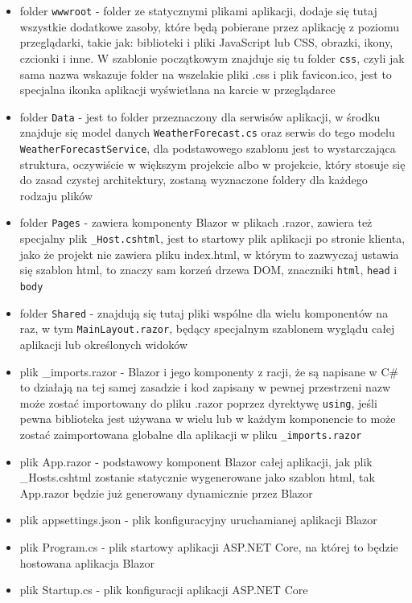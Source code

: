 \documentclass[12pt,a4paper,oneside]{book}
\begin{document}
\begin{itemize}
  \item folder \texttt{wwwroot} - folder ze statycznymi plikami aplikacji, dodaje się tutaj wszystkie dodatkowe zasoby, które będą pobierane przez aplikację z poziomu przeglądarki, takie jak: biblioteki i pliki JavaScript lub CSS, obrazki, ikony, czcionki i inne. W szablonie początkowym znajduje się tu folder \texttt{css}, czyli jak sama nazwa wskazuje folder na wszelakie pliki .css i plik favicon.ico, jest to specjalna ikonka aplikacji wyświetlana na karcie w przeglądarce
  \item folder \texttt{Data} - jest to folder przeznaczony dla serwisów aplikacji, w środku znajduje się model danych \texttt{WeatherForecast.cs} oraz serwis do tego modelu \texttt{WeatherForecastService}, dla podstawowego szablonu jest to wystarczająca struktura, oczywiście w większym projekcie albo w projekcie, który stosuje się do zasad czystej architektury, zostaną wyznaczone foldery dla każdego rodzaju plików
  \item folder \texttt{Pages} - zawiera komponenty Blazor w plikach .razor, zawiera też specjalny plik \texttt{\_Host.cshtml}, jest to startowy plik aplikacji po stronie klienta, jako że projekt nie zawiera pliku index.html, w którym to zazwyczaj ustawia się szablon html, to znaczy sam korzeń drzewa DOM, znaczniki \texttt{html}, \texttt{head} i \texttt{body}
  \item folder \texttt{Shared} - znajdują się tutaj pliki wspólne dla wielu komponentów na raz, w tym \texttt{MainLayout.razor}, będący specjalnym szablonem wyglądu całej aplikacji lub określonych widoków
  \item plik \_imports.razor - Blazor i jego komponenty z racji, że są napisane w C\# to działają na tej samej zasadzie i kod zapisany w pewnej przestrzeni nazw może zostać importowany do pliku .razor poprzez dyrektywę \texttt{using}, jeśli pewna biblioteka jest używana w wielu lub w każdym komponencie to może zostać zaimportowana globalne dla aplikacji w pliku \texttt{\_imports.razor}
  \item plik App.razor - podstawowy komponent Blazor całej aplikacji, jak plik \_Hosts.cshtml zostanie statycznie wygenerowane jako szablon html, tak App.razor będzie już generowany dynamicznie przez Blazor
  \item plik appsettings.json - plik konfiguracyjny uruchamianej aplikacji Blazor
  \item plik Program.cs - plik startowy aplikacji ASP.NET Core, na której to będzie hostowana aplikacja Blazor
  \item plik Startup.cs - plik konfiguracji aplikacji ASP.NET Core
\end{itemize}
\end{document}
